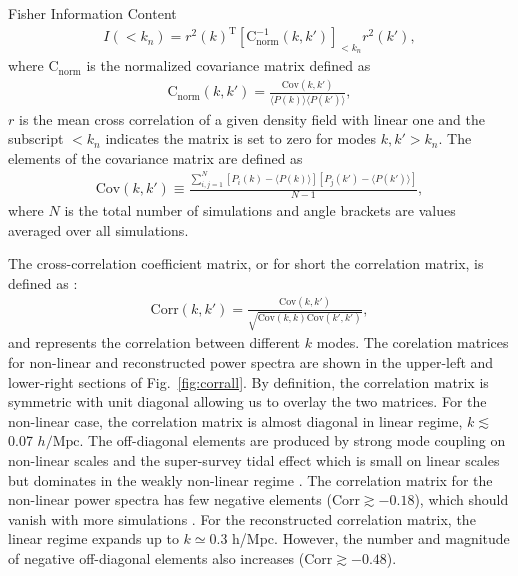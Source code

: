 \begin{section}{Fisher Information Content}
\begin{align}
    I \left( < k_n\right) = r^2(k)^{\mathrm{T}} \left[ \mathrm{C^{-1}_{norm}} 
    ( k,k' )\right]_{<k_n} r^2(k') ,
    \label{eq:fisherformulaused}
  \end{align}
  where $\mathrm{C_{norm}}$ is the normalized covariance matrix
  defined as
  \begin{align}
    \mathrm{C_{norm}} \left( k,k' \right)=\frac{\mathrm{Cov}(k,k')}
    {\langle P(k)\rangle\langle P(k')\rangle},
  \end{align}
  $r$ is the mean cross correlation of a given density field with
  linear one and the subscript $<k_n$ indicates the matrix is set to
  zero for modes $k,k'>k_n$.  The elements of the covariance matrix are defined as
  \begin{align}
    \mathrm{Cov}\left(k,k'\right)\equiv \frac{\sum_{i,j=1}^{N}\left[ P_i \left( k \right) - 
    \langle P \left( k \right) \rangle \right]\left[ P_j \left( k' \right) - 
    \langle P \left( k' \right)\rangle \right]}{N-1},
  \end{align}
  where $N$ is the total number of simulations and angle brackets are
  values averaged over all simulations.  

  The cross-correlation coefficient matrix, or for short the correlation matrix, 
  is defined as :
  \begin{align}
    \mathrm{Corr}\left(k,k'\right)=\frac{\mathrm{Cov}\left(k,k'\right)}
    {\sqrt{\mathrm{Cov}\left(k,k\right)\mathrm{Cov}\left(k',k'\right)}},
  \end{align}
  and represents the correlation between different $k$ modes.  The
  corelation matrices for non-linear and reconstructed power spectra
  are shown in the upper-left and lower-right sections of Fig.~\ref{fig:corrall}.
  By definition, the correlation matrix is symmetric with unit
  diagonal allowing us to overlay the two matrices.  For the
  non-linear case, the correlation matrix is almost diagonal in linear
  regime, $k \lesssim$ 0.07 $h/\mathrm{Mpc}$.  The off-diagonal
  elements are produced by strong mode coupling on non-linear scales
  and the super-survey tidal effect which is small on linear scales
  but dominates in the weakly non-linear regime
  \cite{bib:Kazuyuki2016}.  The correlation matrix for the non-linear
  power spectra has few negative elements
  ($\mathrm{Corr} \gtrsim -0.18$), which should vanish with more
  simulations \cite{bib:Takahashi2009}.  For the reconstructed
  correlation matrix, the linear regime expands up to $k \simeq 0.3$
  h/Mpc.  However, the number and magnitude of negative off-diagonal
  elements also increases ($\mathrm{Corr} \gtrsim -0.48$).


\end{section}

